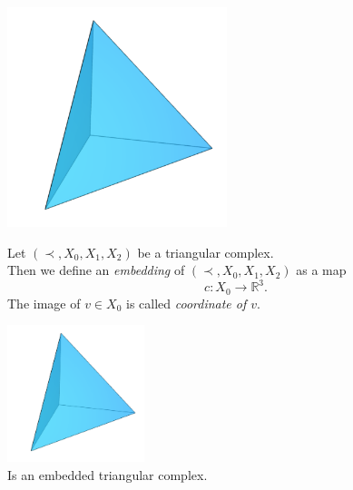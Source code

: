 \documentclass{beamer}
\numberwithin{equation}{aufgabe}
\newcommand\R{\mathbb R}
\begin{document}
\begin{frame}
    \begin{example}
        \includegraphics[width=0.48\textwidth]{images/tet.png}
        \\
         \hspace{75pt} 
    \end{example}
\end{frame}

\begin{frame}
    \begin{definition}\label{def:embedding}
        Let $(\prec, X_0, X_1, X_2)$ be a triangular complex. \\ \pause
        Then we define an \emph{embedding} of $(\prec, X_0, X_1, X_2)$ as a map 
        $$c: X_0 \to \R^3.$$ 
        The image of $v \in X_0$ is called \emph{coordinate of $v$}.
    \end{definition}
    \pause
    \begin{example}
        \centering
        \includegraphics[width=0.3\textwidth]{images/tet.png}\\
        Is an embedded triangular complex.
    \end{example}
\end{frame}
\end{document}

